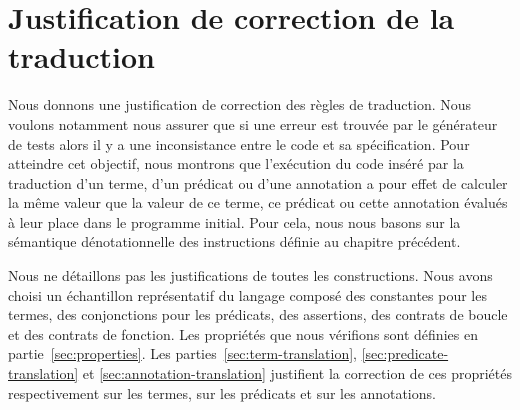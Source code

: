 

\section{Justification de correction de la traduction}
\label{sec:justif}


Nous donnons une justification de correction des règles de traduction.
Nous voulons notamment nous assurer que si une erreur est trouvée par le
générateur de tests alors il y a une inconsistance entre le code et sa
spécification.
Pour atteindre cet objectif, nous montrons que l'exécution du code inséré par
la traduction d'un terme, d'un prédicat ou d'une annotation a pour effet de
calculer la même valeur que la valeur de ce terme, ce prédicat ou cette
annotation évalués à leur place dans le programme initial.
Pour cela, nous nous basons sur la sémantique dénotationnelle des instructions
définie au chapitre précédent.

Nous ne détaillons pas les justifications de toutes les constructions.
Nous avons choisi un échantillon représentatif du langage composé des constantes
pour les termes, des conjonctions pour les prédicats, des assertions, des
contrats de boucle et des contrats de fonction.
Les propriétés que nous vérifions sont définies en partie~\ref{sec:properties}.
Les parties~\ref{sec:term-translation}, \ref{sec:predicate-translation} et
\ref{sec:annotation-translation} justifient la correction de ces propriétés
respectivement sur les termes, sur les prédicats et sur les annotations.


